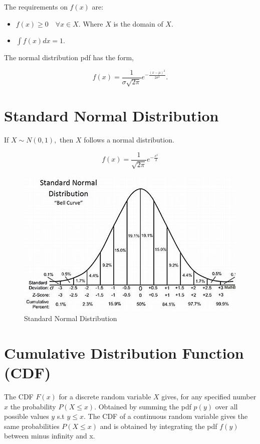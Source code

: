 \documentclass[12pt, a4paper]{report}
\newcommand\ddfrac[2]{\frac{\displaystyle #1}{\displaystyle #2}}
\begin{document}
  The requirements on $ f(x) $ are:

  \begin{itemize}
    \item $ f(x) \geq 0  \quad \forall x \in X. $ Where $ X $ is the domain of $ X. $
    \item $ \int f(x)dx = 1. $
  \end{itemize}

  The normal distribution pdf has the form,

  \[
      f(x) = \ddfrac{1}{\sigma \sqrt{2\pi}}e^{- \ddfrac{(x - \mu)^2}{2\sigma ^2}}
    .\]

  \newpage
  \section{Standard Normal Distribution}

  If $ X \sim N(0, 1), $ then $ X $ follows a normal distribution.

  \begin{equation}
    f(x) = \ddfrac{1}{\sqrt{2\pi}}e^{- \ddfrac{x ^2}{2}}
  \end{equation}

  \begin{figure}
    \centering
    \includegraphics{figures/normaldis.jpg}
    \caption{Standard Normal Distribution}
  \end{figure}

  \section{Cumulative Distribution Function (CDF)}

  The CDF $ F(x) $ for a discrete random variable $ X $ gives, for any specified number $ x $ the probability $ P(X \leq x). $ Obtained by summing the pdf $ p(y) $ over all possible values $ y $ s.t $ y \leq x. $ The CDF of a continuous random variable gives the same probabilities $ P(X \leq x) $ and is obtained by integrating the pdf $ f(y) $ between minus infinity and x.
\end{document}
